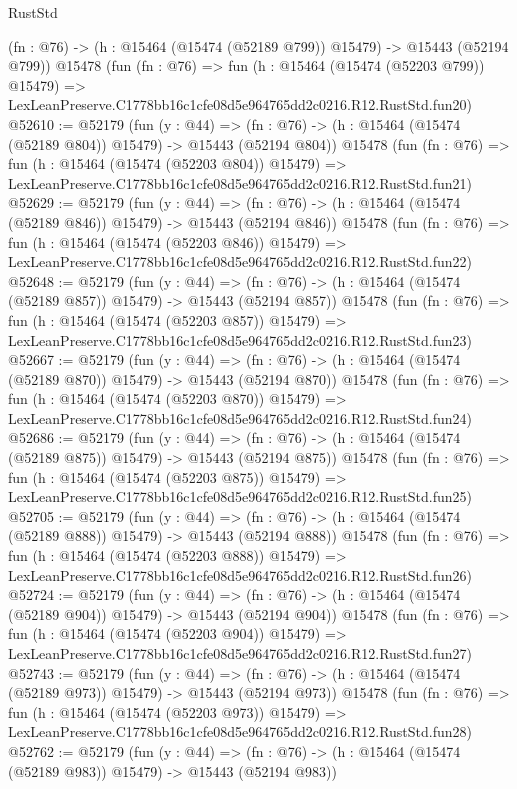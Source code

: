 \begin{lexlean}{RustStd}
\begin{coremodule}
    (fn : @76) -> (h : @15464 (@15474 (@52189 @799)) @15479) -> @15443 (@52194 @799))
    @15478
    (fun (fn : @76) =>
    fun (h : @15464 (@15474 (@52203 @799)) @15479) =>
    LexLeanPreserve.C1778bb16c1cfe08d5e964765dd2c0216.R12.RustStd.fun20)
@52610 := @52179
    (fun (y : @44) =>
    (fn : @76) -> (h : @15464 (@15474 (@52189 @804)) @15479) -> @15443 (@52194 @804))
    @15478
    (fun (fn : @76) =>
    fun (h : @15464 (@15474 (@52203 @804)) @15479) =>
    LexLeanPreserve.C1778bb16c1cfe08d5e964765dd2c0216.R12.RustStd.fun21)
@52629 := @52179
    (fun (y : @44) =>
    (fn : @76) -> (h : @15464 (@15474 (@52189 @846)) @15479) -> @15443 (@52194 @846))
    @15478
    (fun (fn : @76) =>
    fun (h : @15464 (@15474 (@52203 @846)) @15479) =>
    LexLeanPreserve.C1778bb16c1cfe08d5e964765dd2c0216.R12.RustStd.fun22)
@52648 := @52179
    (fun (y : @44) =>
    (fn : @76) -> (h : @15464 (@15474 (@52189 @857)) @15479) -> @15443 (@52194 @857))
    @15478
    (fun (fn : @76) =>
    fun (h : @15464 (@15474 (@52203 @857)) @15479) =>
    LexLeanPreserve.C1778bb16c1cfe08d5e964765dd2c0216.R12.RustStd.fun23)
@52667 := @52179
    (fun (y : @44) =>
    (fn : @76) -> (h : @15464 (@15474 (@52189 @870)) @15479) -> @15443 (@52194 @870))
    @15478
    (fun (fn : @76) =>
    fun (h : @15464 (@15474 (@52203 @870)) @15479) =>
    LexLeanPreserve.C1778bb16c1cfe08d5e964765dd2c0216.R12.RustStd.fun24)
@52686 := @52179
    (fun (y : @44) =>
    (fn : @76) -> (h : @15464 (@15474 (@52189 @875)) @15479) -> @15443 (@52194 @875))
    @15478
    (fun (fn : @76) =>
    fun (h : @15464 (@15474 (@52203 @875)) @15479) =>
    LexLeanPreserve.C1778bb16c1cfe08d5e964765dd2c0216.R12.RustStd.fun25)
@52705 := @52179
    (fun (y : @44) =>
    (fn : @76) -> (h : @15464 (@15474 (@52189 @888)) @15479) -> @15443 (@52194 @888))
    @15478
    (fun (fn : @76) =>
    fun (h : @15464 (@15474 (@52203 @888)) @15479) =>
    LexLeanPreserve.C1778bb16c1cfe08d5e964765dd2c0216.R12.RustStd.fun26)
@52724 := @52179
    (fun (y : @44) =>
    (fn : @76) -> (h : @15464 (@15474 (@52189 @904)) @15479) -> @15443 (@52194 @904))
    @15478
    (fun (fn : @76) =>
    fun (h : @15464 (@15474 (@52203 @904)) @15479) =>
    LexLeanPreserve.C1778bb16c1cfe08d5e964765dd2c0216.R12.RustStd.fun27)
@52743 := @52179
    (fun (y : @44) =>
    (fn : @76) -> (h : @15464 (@15474 (@52189 @973)) @15479) -> @15443 (@52194 @973))
    @15478
    (fun (fn : @76) =>
    fun (h : @15464 (@15474 (@52203 @973)) @15479) =>
    LexLeanPreserve.C1778bb16c1cfe08d5e964765dd2c0216.R12.RustStd.fun28)
@52762 := @52179
    (fun (y : @44) =>
    (fn : @76) -> (h : @15464 (@15474 (@52189 @983)) @15479) -> @15443 (@52194 @983))

\end{coremodule}
\end{lexlean}

